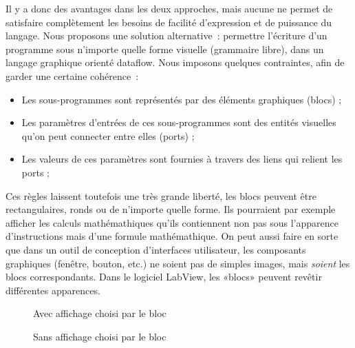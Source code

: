\documentclass{article}
\begin{document}
Il y a donc des avantages dans les deux approches, mais aucune ne permet de satisfaire complètement les besoins de facilité d'expression et
de puissance du langage. Nous proposons une solution alternative~: permettre l'écriture d'un programme sous n'importe quelle forme visuelle
(grammaire libre), dans un langage graphique orienté dataflow. Nous imposons quelques contraintes, afin de garder une certaine cohérence~:
\begin{itemize}
\item Les sous-programmes sont représentés par des éléments graphiques (blocs) ;
\item Les paramètres d'entrées de ces sous-programmes sont des entités visuelles qu'on peut connecter entre elles (ports) ;
\item Les valeurs de ces paramètres sont fournies à travers des liens qui relient les ports ;
\end{itemize}
Ces règles laissent toutefois une très grande liberté, les blocs peuvent être rectangulaires, ronds ou de n'importe quelle forme. Ils
pourraient par exemple afficher les calculs mathémathiques qu'ils contiennent non pas sous l'apparence d'instructions mais d'une formule
mathémathique. On peut aussi faire en sorte que dans un outil de conception d'interfaces utilisateur, les composants graphiques (fenêtre,
bouton, etc.) ne soient pas de simples images, mais \emph{soient} les blocs correspondants. Dans le logiciel LabView, les «blocs» peuvent
revêtir différentes apparences.
\begin{figure}[h!]
  \centering
  \caption{Avec affichage choisi par le bloc}
  \label{fig:affichage-math-oui}
\end{figure}
\begin{figure}[h!]
  \centering
  \caption{Sans affichage choisi par le bloc}
  \label{fig:affichage-math-non}
\end{figure}
\end{document}
